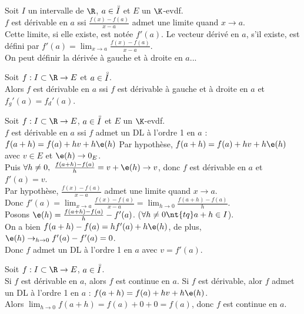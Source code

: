 \documentclass[11pt]{article}
\begin{document}
\begin{defi}{}{}
    Soit $I$ un intervalle de $\R$, $a\in\accentset{\circ}{I}$ et $E$ un $\K$-evdf.\\
    $f$ est dérivable en $a$ ssi $\frac{f(x)-f(a)}{x-a}$ admet une limite quand $x\to a$.\\
    Cette limite, si elle existe, est notée $f'(a)$.
    Le vecteur dérivé en $a$, s'il existe, est défini par $f'(a)=\lim_{x\to a}\frac{f(x)-f(a)}{x-a}$.\\
    On peut définir la dérivée à gauche et à droite en $a$...
\end{defi}

\vspace*{-0.7cm}

\begin{prop}{}{}
    Soit $f:I\subset \R \to E$ et $a\in\accentset{\circ}{I}$.\\
    Alors $f$ est dérivable en $a$ ssi $f$ est dérivable à gauche et à droite en $a$ et $f_g'(a)=f_d'(a)$.
\end{prop}

\vspace*{-0.7cm}

\begin{prop}{}{}
    Soit $f:I\subset \R \to E$, $a\in\accentset{\circ}{I}$ et $E$ un $\K$-evdf.\\
    $f$ est dérivable en $a$ ssi $f$ admet un DL à l'ordre 1 en $a$ : $f(a+h)=f(a)+hv+h\e(h)$ 
    \tcblower
    \boxed{\la} Par hypothèse, $f(a+h)=f(a)+hv+h\e(h)$ avec $v\in E$ et $\e(h)\to0_E$.\\
    Puis $\forall h \neq 0, ~ \frac{f(a+h)-f(a)}{h}=v+\e(h)\to v$, donc $f$ est dérivable en $a$ et $f'(a)=v$.\\
    \boxed{\ra} Par hypothèse, $\frac{f(x)-f(a)}{x-a}$ admet une limite quand $x\to a$.\\
    Donc $f'(a)=\lim_{x\to a}\frac{f(x)-f(a)}{x-a}=\lim_{h\to 0}\frac{f(a+h)-f(a)}{h}$.\\
    Posons $\e(h)=\frac{f(a+h)-f(a)}{h}-f'(a)$. ($\forall h \neq 0 \nt{ tq } a+h\in I$).\\
    On a bien $f(a+h)-f(a)=hf'(a)+h\e(h)$, de plus, $\e(h)\to_{h\to 0}f'(a)-f'(a)=0$.\\
    Donc $f$ admet un DL à l'ordre 1 en $a$ avec $v=f'(a)$.
\end{prop}

\begin{prop}{}{}
    Soit $f:I\subset\R\to E$, $a\in\accentset{\circ}{I}$.\\
    Si $f$ est dérivable en $a$, alors $f$ est continue en $a$.
    \tcblower
    Si $f$ est dérivable, alor $f$ admet un DL à l'ordre 1 en $a$ : $f(a+h)=f(a)+hv+h\e(h)$.\\
    Alors $\lim_{h\to0} f(a+h)=f(a)+0+0=f(a)$, donc $f$ est continue en $a$.
\end{prop}
\end{document}
